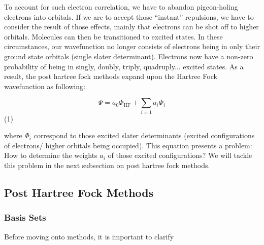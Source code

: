 \documentclass{article}
\begin{document}

      To account for such electron correlation, we have to abandon
      pigeon-holing electrons into orbitals. If we are to accept those
      ``instant'' repulsions, we have to consider the result of those
      effects, mainly that electrons can be shot off to higher orbitals.
      Molecules can then be transitioned to excited states. In these
      circumstances, our wavefunction no longer consists of electrons
      being in only their ground state orbitals (single slater determinant).
      Electrons now have a non-zero probability of being in singly, doubly,
      triply, quadruply... excited states. As a result, the post hartree
      fock methods expand upon the Hartree Fock wavefunction as following:

      \[\Psi = a_0\Phi_{\text{HF}} + \sum_{i = 1} a_i\Phi_i\] (1)

      where \(\Phi_i\) correspond to those excited slater determinants
      (excited configurations of electrons/ higher orbitals being occupied).
      This equation presents a problem: How to determine the weights \(a_i\)
      of those excited configurations? We will tackle this problem in the
      next subsection on post hartree fock methods.


  \subsection{Post Hartree Fock Methods}
    \subsubsection{Basis Sets}
      Before moving onto methods, it is important to clarify
\end{document}

